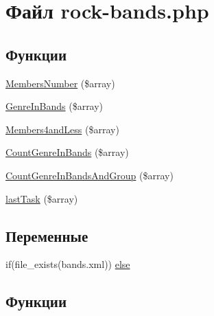\hypertarget{rock-bands_8php}{}\section{Файл rock-\/bands.php}
\label{rock-bands_8php}
\subsection*{Функции}
\begin{DoxyCompactItemize}
\item 
\hyperlink{rock-bands_8php_ae52648c9edc1aae7a0103187546321c7}{Members\+Number} (\$array)
\item 
\hyperlink{rock-bands_8php_a4a6b5c4e2fd02af13f4d0dfa183602a8}{Genre\+In\+Bands} (\$array)
\item 
\hyperlink{rock-bands_8php_a9ce4debc40987332158ad7f251ff8df3}{Members4and\+Less} (\$array)
\item 
\hyperlink{rock-bands_8php_a930fd6d203dd37756a65abc1e6c641b7}{Count\+Genre\+In\+Bands} (\$array)
\item 
\hyperlink{rock-bands_8php_ab3b5bf660a96035ba6c4fd14a972f0c7}{Count\+Genre\+In\+Bands\+And\+Group} (\$array)
\item 
\hyperlink{rock-bands_8php_a8a464fd50d3ff31fafbde1dfe83ec9c5}{last\+Task} (\$array)
\end{DoxyCompactItemize}
\subsection*{Переменные}
\begin{DoxyCompactItemize}
\item 
if(file\+\_\+exists(\textquotesingle{}bands.\+xml\textquotesingle{})) \hyperlink{rock-bands_8php_a10fc9dda0e4ffe9e7c1e5204da454f07}{else}
\end{DoxyCompactItemize}


\subsection{Функции}
